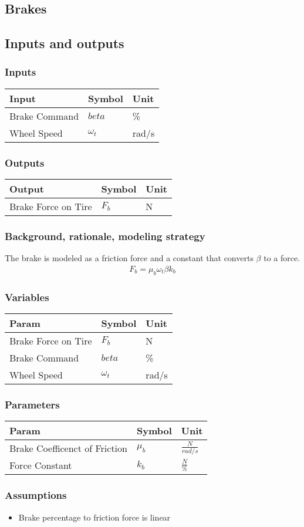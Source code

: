 \documentclass[../SimBALink.tex]{subfiles}
\begin{document}
\subsection{Brakes}

\subsection{Inputs and outputs}
	\subsubsection{Inputs}
	\begin{tabular}{ l | l | l  }
		Input					&	Symbol		&	Unit		\\	\hline
		Brake Command			& 	$beta$ 		&	\% \\
		Wheel Speed				&	$\omega_t$	&	rad/s
	\end{tabular}
	
	\subsubsection{Outputs}
	\begin{tabular}{ l | l | l  }
		Output					&	Symbol		&	Unit		\\	\hline
		Brake Force on Tire		&	$F_b$		&	N
	\end{tabular}

\subsubsection{Background, rationale, modeling strategy}
The brake is modeled as a friction force and a constant that converts $\beta$ to a force.
		\begin{gather}
			F_b = \mu_b \omega_t \beta k_b
		\end{gather}
		
\subsubsection{Variables}
	\begin{tabular}{ l | l | l  }
		Param									&	Symbol		&	Unit		\\	\hline
		Brake Force on Tire		&	$F_b$		&	N \\
		Brake Command			& 	$beta$ 		&	\% \\
		Wheel Speed				&	$\omega_t$	&	rad/s
	\end{tabular}

\subsubsection{Parameters}
	\begin{tabular}{ l | l | l  }
		Param									&	Symbol		&	Unit		\\	\hline
		Brake Coefficenct of Friction		&	$\mu_b$		&	 $\frac{N}{rad/s}$ \\
		Force Constant						&	$k_b$		&	 $\frac{N}{\%}$
	\end{tabular}

\subsubsection{Assumptions}
\begin{itemize}
  \item Brake percentage to friction force is linear
\end{itemize}
\end{document}
